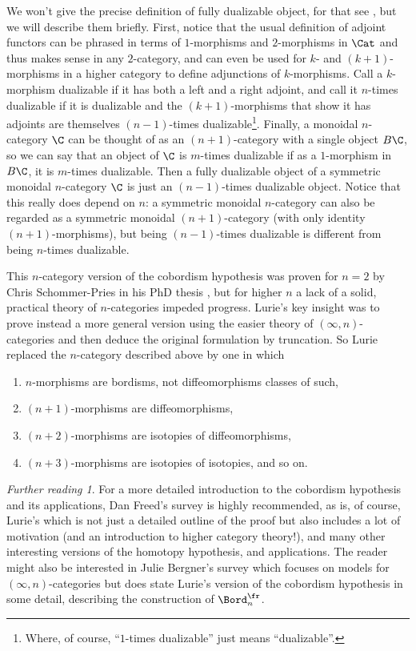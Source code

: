 \documentclass{conm-p-l}
\theoremstyle{definition} \newtheorem{definition}[theorem]{Definition}
\theoremstyle{remark} \newtheorem{remark}[theorem]{Remark}
\newtheorem*{further}{Further reading}
\numberwithin{equation}{section}
\newcommand{\oo}{\infty}
\begin{document}
We won't give the precise definition of fully dualizable object, for
that see \cite[Section 2.3]{LurieCob}, but we will describe them
briefly. First, notice that the usual definition of adjoint functors
can be phrased in terms of $1$-morphisms and $2$-morphisms in $\Cat$
and thus makes sense in any $2$-category, and can even be used for
$k$- and $(k+1)$-morphisms in a higher category to define adjunctions
of $k$-morphisms. Call a $k$-morphism dualizable if it has both a left
and a right adjoint, and call it $n$-times dualizable if it is
dualizable and the $(k+1)$-morphisms that show it has adjoints are
themselves $(n-1)$-times dualizable\footnote{Where, of course,
  ``$1$-times dualizable'' just means ``dualizable''.}. Finally, a
monoidal $n$-category $\C$ can be thought of as an $(n+1)$-category
with a single object $B\C$, so we can say that an object of $\C$ is
$m$-times dualizable if as a $1$-morphism in $B\C$, it is $m$-times
dualizable. Then a fully dualizable object of a symmetric monoidal
$n$-category $\C$ is just an $(n-1)$-times dualizable object. Notice
that this really does depend on $n$: a symmetric monoidal $n$-category
can also be regarded as a symmetric monoidal $(n+1)$-category (with
only identity $(n+1)$-morphisms), but being $(n-1)$-times dualizable
is different from being $n$-times dualizable.

This $n$-category version of the cobordism hypothesis was proven for
$n=2$ by Chris Schommer-Pries in his PhD thesis \cite{S-PTQFT}, but
for higher $n$ a lack of a solid, practical theory of $n$-categories
impeded progress. Lurie's key insight was to prove instead a more general
version using the easier theory of $(\oo,n)$-categories and then
deduce the original formulation by truncation. So Lurie replaced the
$n$-category described above by one in which
\begin{enumerate}
  \item $n$-morphisms are bordisms, not diffeomorphisms classes of such,
  \item $(n+1)$-morphisms are diffeomorphisms,
  \item $(n+2)$-morphisms are isotopies of diffeomorphisms,
  \item $(n+3)$-morphisms are isotopies of isotopies, and so on.
\end{enumerate}

\begin{further}
  For a more detailed introduction to the cobordism hypothesis and its
  applications, Dan Freed's survey \cite{Freed} is highly recommended,
  as is, of course, Lurie's \cite{LurieCob} which is not just a
  detailed outline of the proof but also includes a lot of motivation
  (and an introduction to higher category theory!), and many other
  interesting versions of the homotopy hypothesis, and applications.
  The reader might also be interested in Julie Bergner's survey
  \cite{BergnerCob} which focuses on models for $(\oo,n)$-categories
  but does state Lurie's version of the cobordism hypothesis in some
  detail, describing the construction of $\Bord^{\fr}_n$.
\end{further}

 {}
\end{document}
